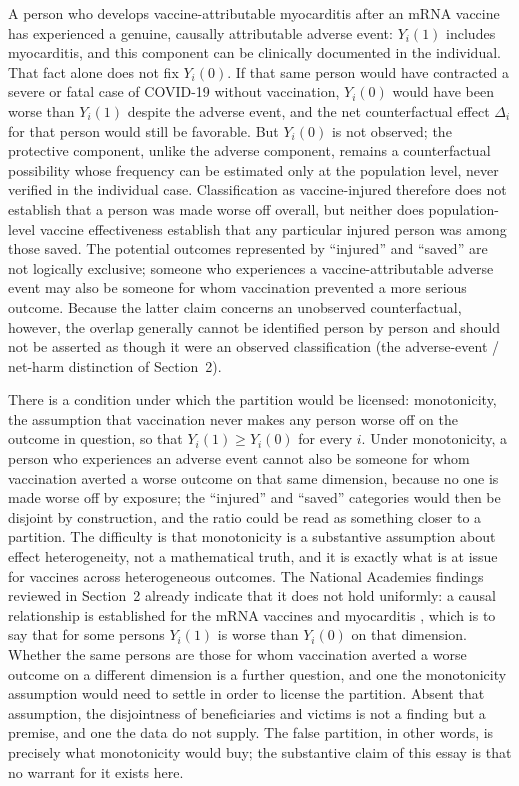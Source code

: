 \documentclass[11pt]{article}
\begin{document}
A person who develops vaccine-attributable myocarditis after an mRNA vaccine has experienced a genuine, causally attributable adverse event: $Y_i(1)$ includes myocarditis, and this component can be clinically documented in the individual. That fact alone does not fix $Y_i(0)$. If that same person would have contracted a severe or fatal case of COVID-19 without vaccination, $Y_i(0)$ would have been worse than $Y_i(1)$ despite the adverse event, and the net counterfactual effect $\Delta_i$ for that person would still be favorable. But $Y_i(0)$ is not observed; the protective component, unlike the adverse component, remains a counterfactual possibility whose frequency can be estimated only at the population level, never verified in the individual case. Classification as vaccine-injured therefore does not establish that a person was made worse off overall, but neither does population-level vaccine effectiveness establish that any particular injured person was among those saved. The potential outcomes represented by ``injured'' and ``saved'' are not logically exclusive; someone who experiences a vaccine-attributable adverse event may also be someone for whom vaccination prevented a more serious outcome. Because the latter claim concerns an unobserved counterfactual, however, the overlap generally cannot be identified person by person and should not be asserted as though it were an observed classification (the adverse-event / net-harm distinction of Section~2).

There is a condition under which the partition would be licensed: monotonicity, the assumption that vaccination never makes any person worse off on the outcome in question, so that $Y_i(1) \geq Y_i(0)$ for every $i$. Under monotonicity, a person who experiences an adverse event cannot also be someone for whom vaccination averted a worse outcome on that same dimension, because no one is made worse off by exposure; the ``injured'' and ``saved'' categories would then be disjoint by construction, and the ratio could be read as something closer to a partition. The difficulty is that monotonicity is a substantive assumption about effect heterogeneity, not a mathematical truth, and it is exactly what is at issue for vaccines across heterogeneous outcomes. The National Academies findings reviewed in Section~2 already indicate that it does not hold uniformly: a causal relationship is established for the mRNA vaccines and myocarditis \citep{nasem2024}, which is to say that for some persons $Y_i(1)$ is worse than $Y_i(0)$ on that dimension. Whether the same persons are those for whom vaccination averted a worse outcome on a different dimension is a further question, and one the monotonicity assumption would need to settle in order to license the partition. Absent that assumption, the disjointness of beneficiaries and victims is not a finding but a premise, and one the data do not supply. The false partition, in other words, is precisely what monotonicity would buy; the substantive claim of this essay is that no warrant for it exists here.
\end{document}
